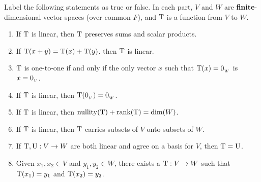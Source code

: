 \exercisesection

\begin{exercise} \label{exercise 2.1.1}
Label the following statements as true or false.
In each part, \(V\) and \(W\) are \textbf{finite}-dimensional vector spaces (over common \(F\)), and \(\mathrm{T}\) is a function from \(V\) to \(W\).
\begin{enumerate}
\item If \(\mathrm{T}\) is linear, then \(\mathrm{T}\) preserves sums and scalar products.
\item If \(\mathrm{T}(x + y) = \mathrm{T}(x) + \mathrm{T}(y)\). then \(\mathrm{T}\) is linear.
\item \(\mathrm{T}\) is one-to-one if and only if the only vector \(x\) such that \(\mathrm{T}(x) = 0_{_W}\) is \(x = 0_{_V}\).
\item If \(\mathrm{T}\) is linear, then \(\mathrm{T}(0_{_V}) = 0_{_W}\).
\item If \(\mathrm{T}\) is linear, then \(\mathrm{nullity}(\mathrm{T}) + \mathrm{rank}(\mathrm{T}) = \dim(W)\).
\item If \(\mathrm{T}\) is linear, then \(\mathrm{T}\) carries \LID{} subsets of \(V\) onto \LID{} subsets of \(W\).
\item If \(\mathrm{T}, \mathrm{U} : V \to W\) are both linear and agree on a basis for \(V\), then \(\mathrm{T} = \mathrm{U}\).
\item Given \(x_1, x_2 \in V\) and \(y_1, y_2 \in W\), there exists a \LTRAN{} \(\mathrm{T} : V \to W\) such that \(\mathrm{T}(x_1) = y_1\) and \(\mathrm{T}(x_2) = y_2\).
\end{enumerate}
\end{exercise}

